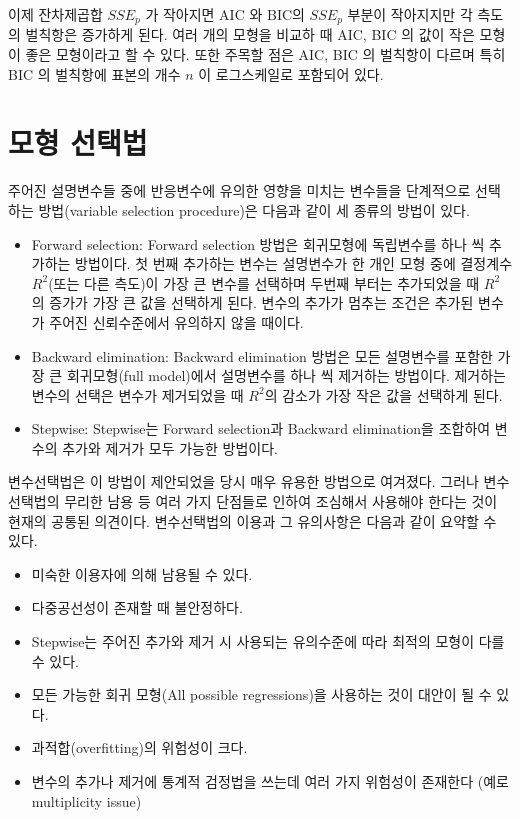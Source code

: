 \documentclass[
  10pt,
]{book}
\theoremstyle{definition}
\theoremstyle{definition}
\theoremstyle{definition}
\theoremstyle{definition}
\theoremstyle{remark}
\begin{document}
이제 잔차제곱합 \(SSE_p\) 가 작아지면 AIC 와 BIC의 \(SSE_p\) 부분이 작아지지만 각 측도의 벌칙항은 증가하게 된다.
여러 개의 모형을 비교하 때 AIC, BIC 의 값이 작은 모형이 좋은 모형이라고 할 수 있다.
또한 주목할 점은 AIC, BIC 의 벌칙항이 다르며 특히 BIC 의 벌칙항에 표본의 개수 \(n\) 이 로그스케일로 포함되어 있다.

\hypertarget{uxbaa8uxd615-uxc120uxd0dduxbc95}{%
\section{모형 선택법}\label{uxbaa8uxd615-uxc120uxd0dduxbc95}}

주어진 설명변수들 중에 반응변수에 유의한 영향을 미치는 변수들을 단계적으로 선택하는 방법(variable selection procedure)은 다음과 같이 세 종류의 방법이 있다.

\begin{itemize}
\item
  Forward selection: Forward selection 방법은 회귀모형에 독립변수를 하나 씩 추가하는 방법이다. 첫 번째 추가하는 변수는 설명변수가 한 개인 모형 중에 결정계수 \(R^2\)(또는 다른 측도)이 가장 큰 변수를 선택하며 두번째 부터는 추가되었을 때 \(R^2\)의 증가가 가장 큰 값을 선택하게 된다. 변수의 추가가 멈추는 조건은 추가된 변수가 주어진 신뢰수준에서 유의하지 않을 때이다.
\item
  Backward elimination: Backward elimination 방법은 모든 설명변수를 포함한 가장 큰 회귀모형(full model)에서 설명변수를 하나 씩 제거하는 방법이다. 제거하는 변수의 선택은 변수가 제거되었을 때 \(R^2\)의 감소가 가장 작은 값을 선택하게 된다.
\item
  Stepwise: Stepwise는 Forward selection과 Backward elimination을 조합하여 변수의 추가와 제거가 모두 가능한 방법이다.
\end{itemize}

변수선택법은 이 방법이 제안되었을 당시 매우 유용한 방법으로 여겨졌다. 그러나 변수선택법의 무리한 남용 등 여러 가지 단점들로 인하여 조심해서 사용해야 한다는 것이 현재의 공통된 의견이다. 변수선택법의 이용과 그 유의사항은 다음과 같이 요약할 수 있다.

\begin{itemize}
\item
  미숙한 이용자에 의해 남용될 수 있다.
\item
  다중공선성이 존재할 때 불안정하다.
\item
  Stepwise는 주어진 추가와 제거 시 사용되는 유의수준에 따라 최적의 모형이 다를 수 있다.
\item
  모든 가능한 회귀 모형(All possible regressions)을 사용하는 것이 대안이 될 수 있다.
\item
  과적합(overfitting)의 위험성이 크다.
\item
  변수의 추가나 제거에 통계적 검정법을 쓰는데 여러 가지 위험성이 존재한다 (예로 multiplicity issue)
\end{itemize}
\end{document}
